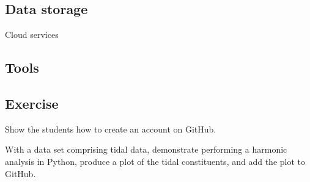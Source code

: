 \documentclass[a4paper,11pt]{article}
\begin{document}
\subsection{Data storage}

Cloud services 

\subsection{Tools}


\subsection{Exercise}
Show the students how to create an account on GitHub.

With a data set comprising tidal data, demonstrate performing a harmonic analysis in Python, produce a plot of the tidal constituents, and add the plot to GitHub.
\end{document}
